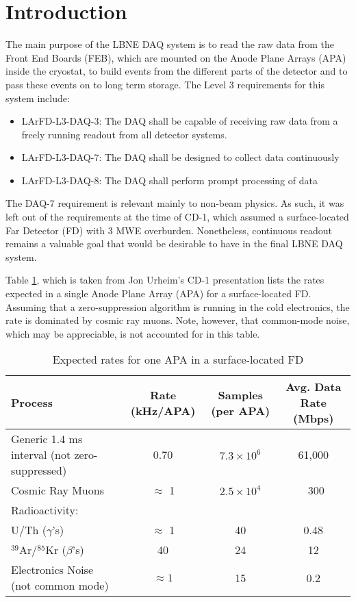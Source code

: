 \section{Introduction}

The main purpose of the LBNE DAQ system is to read the raw data from the 
Front End Boards (FEB), which are mounted on the Anode Plane Arrays (APA) inside
the cryostat, to build events from the different parts
of the detector and to pass these events on to long term storage.
The Level 3 requirements for this system include\cite{DAQ_REQ}:

\begin{itemize}
\item{LArFD-L3-DAQ-3: The DAQ shall be capable of receiving raw data from a freely running readout from all detector systems.}
\item{LArFD-L3-DAQ-7: The DAQ shall be designed to collect data continuously}
\item{LArFD-L3-DAQ-8: The DAQ shall perform prompt processing of data}
\end{itemize}
The DAQ-7 requirement is relevant mainly to non-beam physics. 
As such, it was left out of the requirements at the time of CD-1, which 
assumed a surface-located Far Detector (FD) with 3 MWE overburden. 
Nonetheless, continuous readout remains a valuable goal that would be desirable to have 
in the final LBNE DAQ system.

Table \ref{tab:rates}, which is taken from Jon Urheim's CD-1 presentation
\cite{DAQ_CD1}
lists
the rates expected in a single Anode Plane Array (APA) for a surface-located
FD.
Assuming that a zero-suppression
algorithm is running in the cold electronics,
the rate is dominated by cosmic ray muons.
Note, however, that common-mode noise,
which may be appreciable,
is not accounted for in this table.

\begin{table}[h]
\begin{tabular}{|p{1.5in}|c|c|c|}
\hline
Process&Rate (kHz/APA)& Samples (per APA) & Avg. Data Rate (Mbps)\\
\hline
Generic 1.4 ms interval (not zero-suppressed)&
0.70&$7.3 \times 10^6$& 61,000\\
\hline
Cosmic Ray Muons & $\approx$ 1 & $2.5 \times 10^4$ & ~300 \\
\hline
Radioactivity: &&& \\
U/Th ($\gamma$'s) & $\approx$ 1&40& 0.48\\
$^{39}$Ar/$^{85}$Kr ($\beta$'s)&40&24&12\\
\hline
Electronics Noise (not common mode) & $\approx 1$ & 15 & 0.2\\
\hline
\end{tabular}
\caption{\label{tab:rates} Expected rates for one APA in a surface-located
FD}
\end{table}

